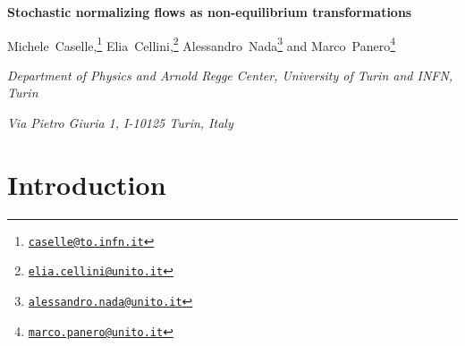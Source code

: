 \documentclass[11pt]{article}
\begin{document}
\begin{titlepage}
\renewcommand\thefootnote{\mbox{$\fnsymbol{footnote}$}}
\begin{center}
{\Large\bf Stochastic normalizing flows as non-equilibrium transformations}
\end{center}
\vskip1.3cm
\centerline{Michele~Caselle,\footnote{\href{mailto:caselle@to.infn.it}{{\tt caselle@to.infn.it}}} Elia~Cellini,\footnote{\href{mailto:elia.cellini@unito.it}{{\tt elia.cellini@unito.it}}} Alessandro~Nada\footnote{\href{mailto:alessandro.nada@unito.it}{{\tt alessandro.nada@unito.it}}} and Marco~Panero\footnote{\href{mailto:marco.panero@unito.it}{{\tt marco.panero@unito.it}}}}
\vskip1.5cm
\centerline{\sl Department of Physics and Arnold Regge Center, University of Turin and INFN, Turin}
\centerline{\sl Via Pietro Giuria 1, I-10125 Turin, Italy}
\vskip1.0cm

\setcounter{footnote}{0}
\renewcommand\thefootnote{\mbox{\arabic{footnote}}}
\begin{abstract}
\noindent
Normalizing flows are a class of deep generative models that provide a promising route to sample lattice field theories more efficiently than conventional Monte~Carlo simulations. In this work we show that the theoretical framework of stochastic normalizing flows, in which neural-network layers are combined with Monte~Carlo updates, is the same that underlies out-of-equilibrium simulations based on Jarzynski's equality, which have been recently deployed to compute free-energy differences in lattice gauge theories. We lay out a strategy to optimize the efficiency of this extended class of generative models and present examples of applications.
\end{abstract}

\end{titlepage}

\section{Introduction}
\label{sec:introduction}
\end{document}
